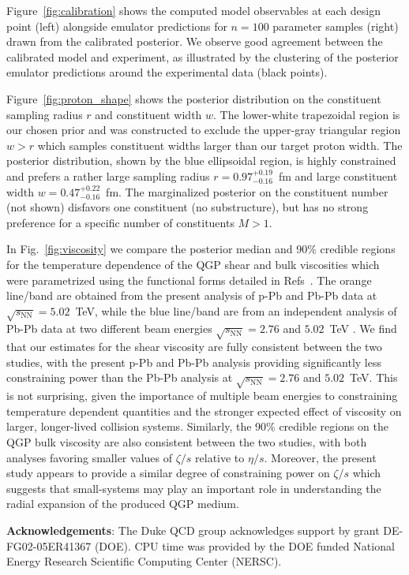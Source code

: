 \documentclass[3p,times,procedia,sort&compress]{elsarticle}
\newcommand{\sqrts}{\sqrt{s_\mathrm{NN}}}
\begin{document}
Figure~\ref{fig:calibration} shows the computed model observables at each design point (left) alongside emulator predictions for $n=100$ parameter samples (right) drawn from the calibrated posterior.
We observe good agreement between the calibrated model and experiment, as illustrated by the clustering of the posterior emulator predictions around the experimental data (black points).

Figure~\ref{fig:proton_shape} shows the posterior distribution on the constituent sampling radius $r$ and constituent width $w$.
The lower-white trapezoidal region is our chosen prior and was constructed to exclude the upper-gray triangular region $w > r$ which samples constituent widths larger than our target proton width.
The posterior distribution, shown by the blue ellipsoidal region, is highly constrained and prefers a rather large sampling radius $r=0.97_{-0.16}^{+0.19}$~fm and large constituent width $w=0.47_{-0.16}^{+0.22}$~fm.
The marginalized posterior on the constituent number (not shown) disfavors one constituent (no substructure), but has no strong preference for a specific number of constituents $M>1$.

In Fig.~\ref{fig:viscosity} we compare the posterior median and 90\% credible regions for the temperature dependence of the QGP shear and bulk viscosities which were parametrized using the functional forms detailed in Refs~\cite{Bass:2017zyn, Bernhard:2018hnz}.
The orange line/band are obtained from the present analysis of p-Pb and Pb-Pb data at $\sqrts=5.02$~TeV, while the blue line/band are from an independent analysis of Pb-Pb data at two different beam energies $\sqrts=2.76$ and $5.02$~TeV \cite{Bernhard:2018hnz}.
We find that our estimates for the shear viscosity are fully consistent between the two studies, with the present p-Pb and Pb-Pb analysis providing significantly less constraining power than the Pb-Pb analysis at $\sqrts=2.76$ and $5.02$~TeV.
This is not surprising, given the importance of multiple beam energies to constraining temperature dependent quantities and the stronger expected effect of viscosity on larger, longer-lived collision systems.
Similarly, the 90\% credible regions on the QGP bulk viscosity are also consistent between the two studies, with both analyses favoring smaller values of $\zeta/s$ relative to $\eta/s$.
Moreover, the present study appears to provide a similar degree of constraining power on $\zeta/s$ which suggests that small-systems may play an important role in understanding the radial expansion of the produced QGP medium.

\vspace{.5em}\noindent\textbf{Acknowledgements}:
The Duke QCD group acknowledges support by grant DE-FG02-05ER41367 (DOE).
CPU time was provided by the DOE funded National Energy Research Scientific Computing Center (NERSC).



\end{document}
